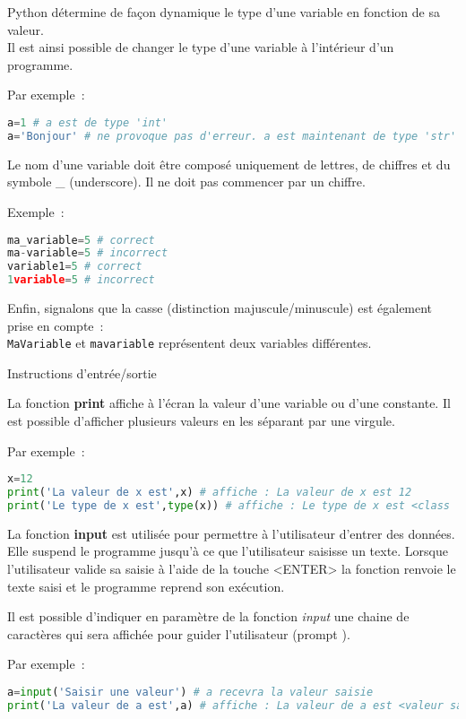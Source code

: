 Python détermine de façon dynamique le type d'une variable en fonction de sa valeur. \\
Il est ainsi possible de changer le type d'une variable à l'intérieur d'un programme.
\par
Par exemple~:
 \begin{lstlisting}[language=Python]
a=1 # a est de type 'int'
a='Bonjour' # ne provoque pas d'erreur. a est maintenant de type 'str'
\end{lstlisting}
Le nom d'une variable doit être composé uniquement de lettres, de chiffres et du symbole \og \_ \fg{} (underscore). Il ne doit pas commencer par un chiffre.
\par
Exemple~:
\begin{lstlisting}[language=Python]
ma_variable=5 # correct
ma-variable=5 # incorrect
variable1=5 # correct
1variable=5 # incorrect
\end{lstlisting}
Enfin, signalons que la casse (distinction majuscule/minuscule) est également prise en compte~: \\
\texttt{MaVariable} et \texttt{mavariable} représentent deux variables différentes.
\begin{h3}Instructions d'entrée/sortie\end{h3}
La fonction \textbf{print} affiche à l'écran la valeur d'une variable ou d'une constante. Il est possible d'afficher plusieurs valeurs en les séparant par une virgule.
\par
Par exemple~:
\begin{lstlisting}[language=Python]
x=12
print('La valeur de x est',x) # affiche : La valeur de x est 12
print('Le type de x est',type(x)) # affiche : Le type de x est <class 'int'>
\end{lstlisting}
La fonction \textbf{input} est utilisée pour permettre à l'utilisateur d'entrer des données. Elle suspend le programme jusqu'à ce que l'utilisateur saisisse un texte. Lorsque l'utilisateur valide sa saisie à l'aide de la touche <ENTER> la fonction renvoie le texte saisi et le programme reprend son exécution.
\par
Il est possible d'indiquer en paramètre de la fonction \textit{input} une chaine de caractères qui sera affichée pour guider l'utilisateur (\og prompt \fg{}).
\par
Par exemple~:
\begin{lstlisting}[language=Python]
a=input('Saisir une valeur') # a recevra la valeur saisie
print('La valeur de a est',a) # affiche : La valeur de a est <valeur saisie par l'utilisateur>
\end{lstlisting}
